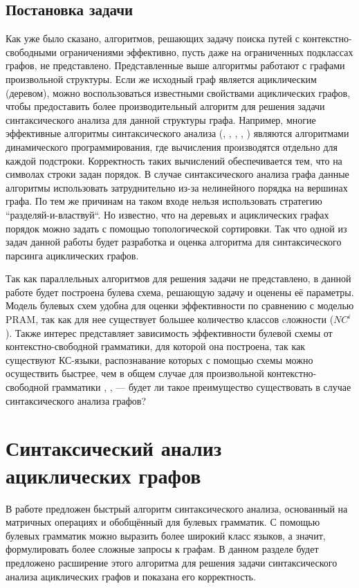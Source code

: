\documentclass{spbau-diploma}
\begin{document}
\subsection{Постановка задачи}
Как уже было сказано, алгоритмов, решающих задачу поиска путей с контекстно-свободными ограничениями эффективно, пусть даже на ограниченных подклассах графов, не представлено. 
Представленные выше алгоритмы работают с графами произвольной
структуры. Если же исходный граф является ациклическим
(деревом), можно воспользоваться известными свойствами
ациклических графов, чтобы предоставить более
производительный алгоритм для решения задачи синтаксического
анализа для данной структуры графа. Например, многие эффективные алгоритмы синтаксического анализа (\cite{Valiant}, \cite{Kasami}, \cite{OkhotinParse}, \cite{Earley}, \cite{Yonger}) являются алгоритмами динамического программирования, где вычисления производятся отдельно для каждой подстроки. Корректность таких вычислений обеспечивается тем, что на символах строки задан порядок. В случае синтаксического анализа графа данные алгоритмы использовать затруднительно из-за нелинейного порядка на вершинах графа. По тем же причинам на таком входе нельзя использовать стратегию ``разделяй-и-властвуй``. Но известно, что на деревьях и ациклических графах порядок можно задать с помощью топологической сортировки. Так что одной из задач данной работы будет разработка и оценка алгоритма для синтаксического парсинга ациклических графов. \par
Так как параллельных алгоритмов для решения задачи не представлено, в данной работе будет построена булева схема, решающую задачу и оценены её параметры. Модель булевых схем удобна для оценки эффективности по сравнению с моделью PRAM, так как для нее существует большее количество классов cложности (${NC}^i$). Также интерес представляет зависимость эффективности булевой схемы от контекстно-свободной грамматики, для которой она построена, так как существуют КС-языки, распознавание которых с помощью схемы можно осуществить быстрее, чем в общем случае для произвольной контекстно-свободной грамматики \cite{Ibarra}, \cite{Dymond}, \cite{LLComp} --- будет ли такое преимущество существовать в случае синтаксического анализа графов?

\section{Синтаксический анализ ациклических графов}
В работе \cite{OkhotinParse} предложен быстрый алгоритм синтаксического
анализа, основанный на матричных операциях и обобщённый для
булевых грамматик. С помощью булевых грамматик можно выразить
более широкий класс языков, а значит, формулировать более
сложные запросы к графам.  В данном разделе будет предложено
расширение этого алгоритма для решения задачи синтаксического
анализа ациклических графов и показана его корректность. 
\end{document}
